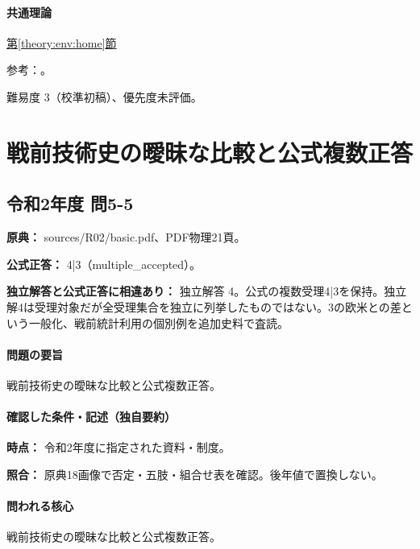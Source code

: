 \paragraph{共通理論} \hyperref[theory:env:home]{第\ref*{theory:env:home}節}

\par 参考：\cite{env59_energy2019}。

\par 難易度 3（校準初稿）、優先度未評価。

\section{戦前技術史の曖昧な比較と公式複数正答}

\subsection{令和2年度 問5-5}
\label{q:r02-reg-basic-5-5}

\noindent\textbf{原典：} sources/R02/basic.pdf、PDF物理21頁。

\textbf{公式正答：} 4|3（multiple\_accepted）。

\par\textbf{独立解答と公式正答に相違あり：} 独立解答 4。公式の複数受理4|3を保持。独立解4は受理対象だが全受理集合を独立に列挙したものではない。3の欧米との差という一般化、戦前統計利用の個別例を追加史料で査読。

\paragraph{問題の要旨} 戦前技術史の曖昧な比較と公式複数正答。

\paragraph{確認した条件・記述（独自要約）}\mbox{}\par

\noindent\textbf{時点：} 令和2年度に指定された資料・制度。\par

\noindent\textbf{照合：} 原典18画像で否定・五肢・組合せ表を確認。後年値で置換しない。\par

\paragraph{問われる核心} 戦前技術史の曖昧な比較と公式複数正答。

